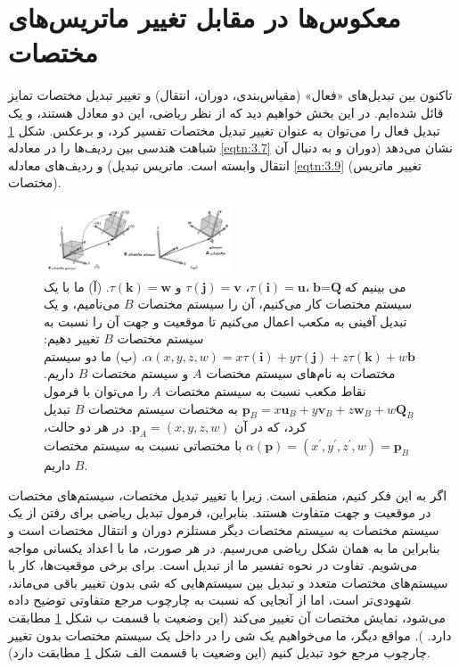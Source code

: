 \section{\textbf{معکوس‌ها در مقابل تغییر ماتریس‌های مختصات}}
\label{sec:3.5}
{
    \Large
    \begin{spacing}{1.5}
        تاکنون بین تبدیل‌های «فعال» (مقیاس‌بندی، دوران، انتقال) و تغییر تبدیل مختصات تمایز قائل شده‌ایم.
        در این بخش خواهیم دید که از نظر ریاضی، این دو معادل هستند، و یک تبدیل فعال را می‌توان به عنوان تغییر تبدیل مختصات تفسیر کرد، و برعکس.
        شکل \ref{fig:4.Session.1.3.15} شباهت هندسی بین ردیف‌ها را در معادله \ref{eqtn:3.7} نشان می‌دهد (دوران و به دنبال آن انتقال وابسته است. ماتریس تبدیل) و ردیف‌های معادله \ref{eqtn:3.9} (تغییر ماتریس مختصات).

        \begin{figure}[H]
            \centering
            \setlength{\belowcaptionskip}{-10pt}
            \includegraphics[width=0.5\textwidth]{Images/4/3/4.Session.1.3.15}
            \caption {می بینیم که$\textbf{b}=\textbf{Q}$،$\tau(\textbf{i})=\textbf{u}$، $\tau(\textbf{j})=\textbf{v}$ و $\tau(\textbf{k})=\textbf{w}$.
                (آ) ما با یک سیستم مختصات کار می‌کنیم، آن را سیستم مختصات $B$ می‌نامیم، و یک تبدیل آفینی به مکعب اعمال می‌کنیم
                تا موقعیت و جهت آن را نسبت به سیستم مختصات $B$ تغییر دهیم: $\alpha(x,y,z,w)=x\tau(\textbf{i})+y\tau(\textbf{j})+z\tau(\textbf{k})+w\textbf{b}$.
                (ب) ما دو سیستم مختصات به نام‌های سیستم مختصات $A$ و سیستم مختصات $B$ داریم.
                نقاط مکعب نسبت به سیستم مختصات $A$ را می‌توان با فرمول $\textbf{p}_{B}=x\textbf{u}_{B}+y\textbf{v}_{B}+z\textbf{w}_{B}+w\textbf{Q}_{B}$ به مختصات سیستم مختصات $B$ تبدیل کرد، که در آن $\textbf{p}_{A}=(x,y,z,w)$.
                در هر دو حالت، $\alpha(\textbf{p})=(x^\prime,y^\prime,z^\prime,w)=\textbf{p}_{B}$ با مختصاتی نسبت به سیستم مختصات $B$ داریم.}
            \label{fig:4.Session.1.3.15}
        \end{figure}

        اگر به این فکر کنیم، منطقی است. زیرا با تغییر تبدیل مختصات، سیستم‌های مختصات در موقعیت و جهت متفاوت هستند.
        بنابراین، فرمول تبدیل ریاضی برای رفتن از یک سیستم مختصات به سیستم مختصات دیگر مستلزم دوران و انتقال مختصات است
        و بنابراین ما به همان شکل ریاضی می‌رسیم. در هر صورت، ما با اعداد یکسانی مواجه می‌شویم.
        تفاوت در نحوه تفسیر ما از تبدیل است. برای برخی موقعیت‌ها، کار با سیستم‌های مختصات متعدد و تبدیل بین سیستم‌هایی که شی بدون تغییر باقی می‌ماند، شهودی‌تر است،
        اما از آنجایی که نسبت به چارچوب مرجع متفاوتی توضیح داده می‌شود، نمایش مختصات آن تغییر می‌کند (این وضعیت با قسمت ب شکل \ref{fig:4.Session.1.3.15} مطابقت دارد. ).
        مواقع دیگر، ما می‌خواهیم یک شی را در داخل یک سیستم مختصات بدون تغییر چارچوب مرجع خود تبدیل کنیم (این وضعیت با قسمت الف شکل \ref{fig:4.Session.1.3.15} مطابقت دارد).


\end{spacing}}
